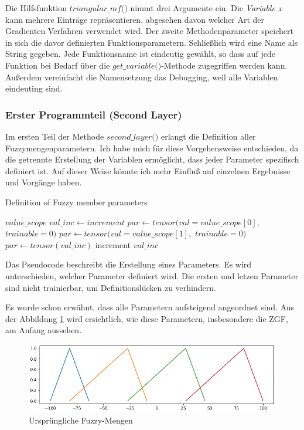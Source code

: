 Die Hilfsfunktion \(\textit{triangular\_mf()}\) nimmt drei Argumente ein. Die \emph{Variable x} kann mehrere Einträge repräsentieren, abgesehen davon welcher Art der Gradienten Verfahren verwendet wird. Der zweite Methodenparameter speichert in sich die davor definierten Funktionsparametern. Schließlich wird eine Name als String gegeben. Jede Funktionsname ist eindeutig gewählt, so dass auf jede Funktion bei Bedarf über die \(\textit{get\_variable()}\)-Methode zugegriffen werden kann. Außerdem vereinfacht die Namensetzung das Debugging, weil alle Variablen eindeuting sind.

\subsubsection{Erster Programmteil (Second Layer)}\label{erster-programmteil-second-layer}

Im ersten Teil der Methode \(\textit{second\_layer()}\) erlangt die Definition aller Fuzzymengenparametern. Ich habe mich für diese Vorgehensweise entschieden, da die getrennte Erstellung der Variablen ermöglicht, dass jeder Parameter spezifisch definiert ist. Auf dieser Weise könnte ich mehr Einfluß auf einzelnen Ergebnisse und Vorgänge haben.

\begin{algorithm}
	\caption{Definition of Fuzzy member parameters}
	\begin{algorithmic}[1]
		\REQUIRE $value\_scope$
		\ENSURE $val\_inc \leftarrow increment$
				\STATE $par \leftarrow tensor(val=value\_scope[0],$ $trainable=0)$
				\STATE $par \leftarrow tensor(val=value\_scope[1],$ $trainable=0)$
			\ELSE
				\STATE $par \leftarrow tensor(val\_inc)$
				\STATE increment $val\_inc$	
			\ENDIF
		\ENDFOR
 	\end{algorithmic}
\end{algorithm}

Das Pseudocode beschreibt die Erstellung eines Parameters. Es wird unterschieden, welcher Parameter definiert wird. Die ersten und letzen Parameter sind nicht trainierbar, um Definitionslücken zu verhindern.

Es wurde schon erwähnt, dass alle Parametern aufsteigend angeordnet sind. Aus der Abbildung \ref{mfs_urs} wird ersichtlich, wie diese Parametern, insbesondere die ZGF, am Anfang aussehen.

\begin{figure}
	\centering
	\includegraphics[scale=0.5]{images/mf_with_parameters.png}
	\caption{Ursprüngliche Fuzzy-Mengen}
	\label{mfs_urs}
\end{figure}


